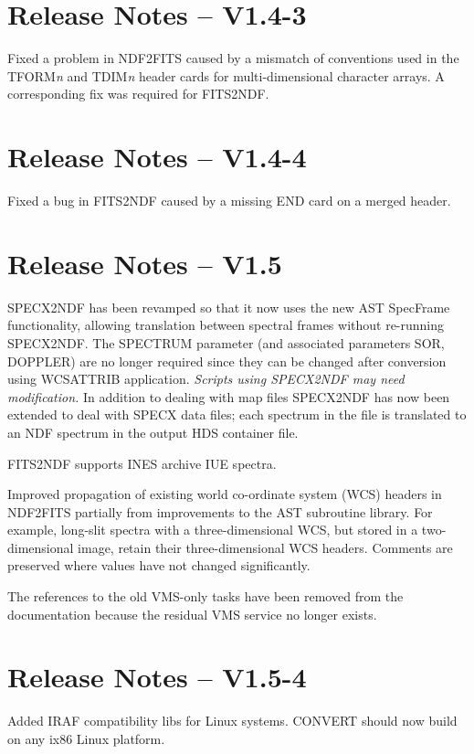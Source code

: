 \documentclass[twoside,11pt]{article}
\newcommand{\htmlref}[2]{#1}
\newcommand{\xref}[3]{#1}
\begin{document}
\section{Release Notes -- V1.4-3}
Fixed a problem in \htmlref{NDF2FITS}{NDF2FITS} caused by a mismatch of
conventions used in the TFORM\textit{n} and TDIM\textit{n} header cards for
multi-dimensional character arrays.  A corresponding fix was required for
\htmlref{FITS2NDF}{FITS2NDF}.

\section{Release Notes -- V1.4-4}
Fixed a bug in \htmlref{FITS2NDF}{FITS2NDF} caused by a missing END card on a
merged header.
  
\section{Release Notes -- V1.5}

\htmlref{SPECX2NDF}{SPECX2NDF} has been revamped so that it now uses
the new AST \xref{SpecFrame functionality}{sun95}{se_wcsuse},
allowing translation between spectral frames without re-running
SPECX2NDF.  The SPECTRUM parameter (and associated parameters SOR,
DOPPLER) are no longer required since they can be changed after
conversion using \xref{WCSATTRIB}{sun95}{WCSATTRIB} application. {\em
Scripts using SPECX2NDF may need modification.} In addition to dealing
with map files SPECX2NDF has now been extended to deal with
\xref{SPECX}{sun17}{data_formats_in_and_data_migration_to_the_unix_version}
data files; each spectrum in the file is translated to an NDF spectrum
in the output HDS container file.

\htmlref{FITS2NDF}{FITS2NDF} supports INES archive IUE spectra.

Improved propagation of existing world co-ordinate system (WCS)
headers in \htmlref{NDF2FITS}{NDF2FITS} partially from improvements to
the \xref{AST subroutine library}{sun210}{}.  For example, long-slit
spectra with a three-dimensional WCS, but stored in a two-dimensional
image, retain their three-dimensional WCS headers.  Comments are
preserved where values have not changed significantly.

The references to the old VMS-only tasks have been removed from the
documentation because the residual VMS service no longer exists.

\section{Release Notes -- V1.5-4}
Added IRAF compatibility libs for Linux systems.  CONVERT should now
build on any ix86 Linux platform. 
\end{document}
